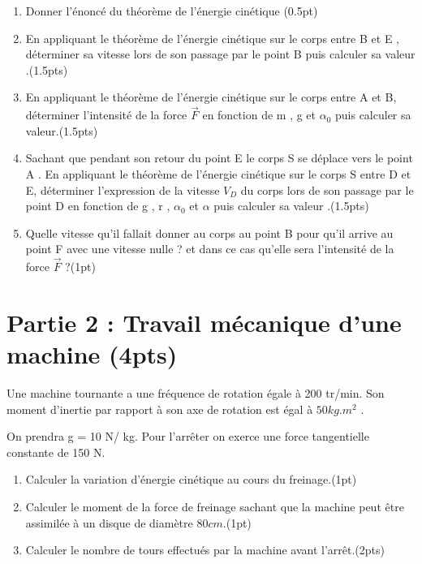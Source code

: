 \documentclass[12pt]{article}
\begin{document}
\begin{enumerate}
    \item  Donner l’énoncé du théorème de l’énergie cinétique \dotfill(0.5pt)
    \item  En appliquant le théorème de l’énergie cinétique sur le corps entre B et E , déterminer sa vitesse lors de son passage par le point B puis calculer sa valeur .\dotfill(1.5pts)
    \item En appliquant le théorème de l’énergie cinétique sur le corps entre A et B, déterminer l'intensité de la force $\vec{F}$ en fonction  de m , g et $\alpha_0$ puis calculer sa valeur.\dotfill(1.5pts)
    \item Sachant que pendant son retour du point E le corps S se déplace vers le point A . En appliquant le théorème de l’énergie cinétique sur le corps S entre D et E, déterminer l’expression de la vitesse $V_D$ du corps lors de son passage par le point D en fonction de g , r , $\alpha_0$ et $\alpha$ puis calculer sa valeur .\dotfill(1.5pts)
    \item Quelle vitesse qu’il fallait donner au corps au point B pour qu’il arrive au point F avec une vitesse nulle ? et dans ce cas qu'elle sera l'intensité de la force $\vec{F}$ ?\dotfill(1pt)


\end{enumerate}




\section*{Partie 2 : Travail mécanique d'une machine \dotfill (4pts)}

Une machine tournante a une fréquence de rotation égale à 200 tr/min. Son moment d'inertie par rapport à son axe de rotation est égal à $50 kg. m^2$ .

On prendra g = 10 N/ kg.
Pour l'arrêter on exerce une force tangentielle constante de 150 N.
\begin{enumerate}
    \item Calculer la variation d'énergie cinétique au cours du freinage.\dotfill(1pt)

\item Calculer le moment de la force de freinage sachant que la machine peut être assimilée à un disque de diamètre $80 cm$.\dotfill(1pt)

\item Calculer le nombre de tours effectués par la machine avant l'arrêt.\dotfill(2pts)
\end{enumerate}
\end{document}
